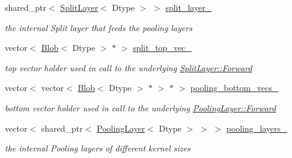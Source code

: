 \begin{DoxyCompactItemize}
\item 
\mbox{\label{classcaffe_1_1_s_p_p_layer_a9a12afd20e56f44a46c1c23753c45c77}} 
shared\+\_\+ptr$<$ \mbox{\hyperlink{classcaffe_1_1_split_layer}{Split\+Layer}}$<$ Dtype $>$ $>$ \mbox{\hyperlink{classcaffe_1_1_s_p_p_layer_a9a12afd20e56f44a46c1c23753c45c77}{split\+\_\+layer\+\_\+}}
\begin{DoxyCompactList}\small\item\em the internal Split layer that feeds the pooling layers \end{DoxyCompactList}\item 
\mbox{\label{classcaffe_1_1_s_p_p_layer_aa407ee06ada28e3091e56756cf44c4f6}} 
vector$<$ \mbox{\hyperlink{classcaffe_1_1_blob}{Blob}}$<$ Dtype $>$ $\ast$ $>$ \mbox{\hyperlink{classcaffe_1_1_s_p_p_layer_aa407ee06ada28e3091e56756cf44c4f6}{split\+\_\+top\+\_\+vec\+\_\+}}
\begin{DoxyCompactList}\small\item\em top vector holder used in call to the underlying \mbox{\hyperlink{classcaffe_1_1_layer_ab57d272dabe8c709d2a785eebe72ca57}{Split\+Layer\+::\+Forward}} \end{DoxyCompactList}\item 
\mbox{\label{classcaffe_1_1_s_p_p_layer_a9ebd99b1507f1ffbee88c5c28077e13a}} 
vector$<$ vector$<$ \mbox{\hyperlink{classcaffe_1_1_blob}{Blob}}$<$ Dtype $>$ $\ast$ $>$ $\ast$ $>$ \mbox{\hyperlink{classcaffe_1_1_s_p_p_layer_a9ebd99b1507f1ffbee88c5c28077e13a}{pooling\+\_\+bottom\+\_\+vecs\+\_\+}}
\begin{DoxyCompactList}\small\item\em bottom vector holder used in call to the underlying \mbox{\hyperlink{classcaffe_1_1_layer_ab57d272dabe8c709d2a785eebe72ca57}{Pooling\+Layer\+::\+Forward}} \end{DoxyCompactList}\item 
\mbox{\label{classcaffe_1_1_s_p_p_layer_a1efd0c8faa6d6f9a108cc4a3f00f6329}} 
vector$<$ shared\+\_\+ptr$<$ \mbox{\hyperlink{classcaffe_1_1_pooling_layer}{Pooling\+Layer}}$<$ Dtype $>$ $>$ $>$ \mbox{\hyperlink{classcaffe_1_1_s_p_p_layer_a1efd0c8faa6d6f9a108cc4a3f00f6329}{pooling\+\_\+layers\+\_\+}}
\begin{DoxyCompactList}\small\item\em the internal Pooling layers of different kernel sizes \end{DoxyCompactList}\item 

\end{DoxyCompactItemize}
